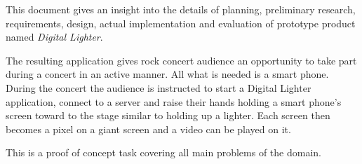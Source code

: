 This document gives an insight into the details of planning, preliminary research, requirements, design, actual implementation and evaluation of prototype product named \emph{Digital Lighter}.

The resulting application gives rock concert audience an opportunity to take part during a concert in an active manner. 
All what is needed is a smart phone.
During the concert the audience is instructed to start a Digital Lighter application, connect to a server and raise their hands holding a smart phone's screen toward to the stage similar to holding up a lighter. 
Each screen then becomes a pixel on a giant screen and a video can be played on it.

This is a proof of concept task covering all main problems of the domain.



